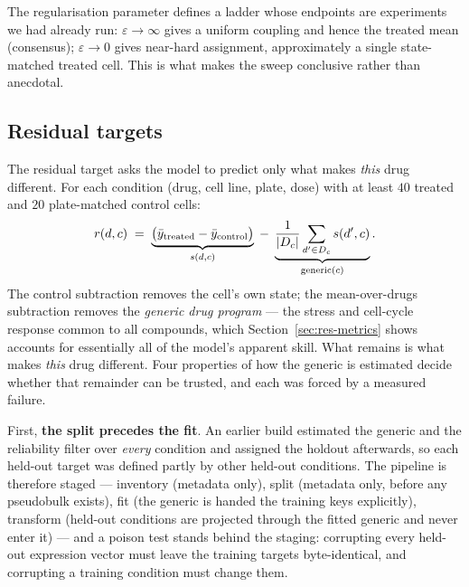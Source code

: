 The regularisation parameter defines a ladder whose endpoints are experiments we had already run:
$\varepsilon\rightarrow\infty$ gives a uniform coupling and hence the treated mean (consensus);
$\varepsilon\rightarrow 0$ gives near-hard assignment, approximately a single state-matched treated
cell. This is what makes the sweep conclusive rather than anecdotal.

\subsection{Residual targets}
\label{sec:methods-residual}

The residual target asks the model to predict only what makes \emph{this} drug different. For each
condition (drug, cell line, plate, dose) with at least $40$ treated and $20$ plate-matched control
cells:
\begin{equation}
  r(d,c) \;=\; \underbrace{\big(\bar{y}_{\textrm{treated}} - \bar{y}_{\textrm{control}}\big)}_{s(d,c)}
  \;-\; \underbrace{\frac{1}{|D_c|}\sum_{d' \in D_c} s(d',c)}_{\textrm{generic}(c)} .
\end{equation}
The control subtraction removes the cell's own state; the mean-over-drugs subtraction removes the
\emph{generic drug program} --- the stress and cell-cycle response common to all compounds, which
Section~\ref{sec:res-metrics} shows accounts for essentially all of the model's apparent skill. What
remains is what makes \emph{this} drug different. Four properties of how the generic is estimated
decide whether that remainder can be trusted, and each was forced by a measured failure.

First, \textbf{the split precedes the fit}. An earlier build estimated the generic and the
reliability filter over \emph{every} condition and assigned the holdout afterwards, so each held-out
target was defined partly by other held-out conditions. The pipeline is therefore staged ---
inventory (metadata only), split (metadata only, before any pseudobulk exists), fit (the generic is
handed the training keys explicitly), transform (held-out conditions are projected through the
fitted generic and never enter it) --- and a poison test stands behind the staging: corrupting every
held-out expression vector must leave the training targets byte-identical, and corrupting a training
condition must change them.

